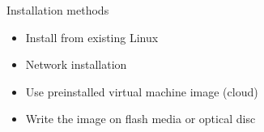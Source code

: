 \begin{frame}{Installation methods}
	\begin{itemize}
            \item Install from existing Linux 
            \item Network installation 
            \item Use preinstalled virtual machine image (cloud)
            \item Write the image on flash media or optical disc
	\end{itemize}
\end{frame}
